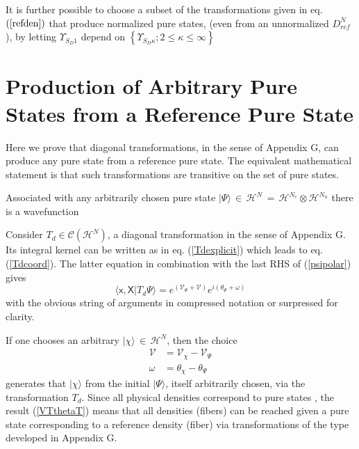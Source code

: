 \documentclass[aps,preprint]{revtex4}%
\begin{document}
It is further possible to choose a subset of the transformations given in eq.
$\left(  \ref{refden}\right)  $ that produce normalized pure states, (even
from an unnormalized $D_{ref}^{N}$), by letting $\Upsilon_{S_{D}1}$ depend on
$\left\{  \Upsilon_{S_{D}\kappa};2\leq\kappa\leq\infty\right\}  $

\section{Production of Arbitrary Pure States from a Reference Pure State}

\noindent Here we prove that diagonal transformations, in the sense of
Appendix G, can produce any pure state from a reference pure state. The
equivalent mathematical statement is that such transformations are transitive
on the set of pure states.

Associated with any arbitrarily chosen pure state $|\Psi\rangle\,\in
\,\mathcal{H}^{N}\,=\,\mathcal{H}^{N_{e}}\otimes\mathcal{H}^{N_{n}}$ there is
a wavefunction


Consider $T_{d}\in\mathcal{C}(\mathcal{H}^{N})$, a diagonal transformation in
the sense of Appendix G. Its integral kernel can be written as in eq.
(\ref{Tdexplicit}) which leads to eq. (\ref{Tdcoord}). The latter equation in
combination with the last RHS of (\ref{psipolar}) gives
\begin{equation}
\langle\mathsf{x},\mathsf{X}|T_{d}\Psi\rangle=e^{(\mathcal{V}_{\Psi}+
\mathcal{V})}e^{i(\theta_{\Psi}+\omega)}%
\end{equation}
with the obvious string of arguments in compressed notation or surpressed for clarity.

If one chooses an arbitrary $|\chi\rangle\,\in\,\mathcal{H}^{N}$, then the
choice
\begin{align}
\mathcal{V}  &  =\mathcal{V}_{\chi}-\mathcal{V}_{\Psi}\nonumber\\
\omega &  =\theta_{\chi}-\theta_{\Psi} \label{VTthetaT}%
\end{align}
generates that $|\chi\rangle$ from the initial $|\Psi\rangle$, itself
arbitrarily chosen, via the transformation $T_{d}$. Since all physical
densities correspond to pure states \cite{Harriman81}, the result
(\ref{VTthetaT}) means that all densities (fibers) can be reached given a pure
state corresponding to a reference density (fiber) via transformations of the
type developed in Appendix G.
\end{document}
